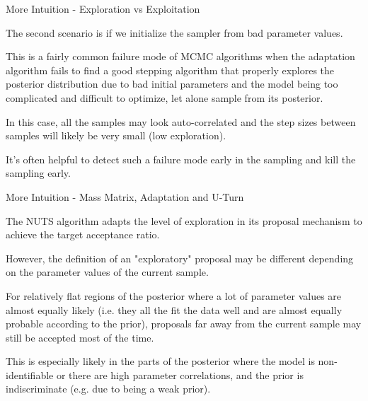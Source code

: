 \begin{frame}{More Intuition - Exploration vs Exploitation}
	\begin{vfilleditems}
		\item The second scenario is if we initialize the sampler from bad parameter values.
			\begin{vfilleditems}
				\item This is a fairly common failure mode of MCMC algorithms when the adaptation algorithm fails to find a good stepping algorithm that properly explores the posterior distribution due to bad initial parameters and the model being too complicated and difficult to optimize, let alone sample from its posterior.
				\item In this case, all the samples may look auto-correlated and the step sizes between samples will likely be very small (low exploration).
				\item It's often helpful to detect such a failure mode early in the sampling and kill the sampling early.
			\end{vfilleditems}
	\end{vfilleditems}
\end{frame}
\begin{frame}{More Intuition - Mass Matrix, Adaptation and U-Turn}
	\begin{vfilleditems}
		\item The NUTS algorithm adapts the level of exploration in its proposal mechanism to achieve the target acceptance ratio.
		\item However, the definition of an "exploratory" proposal may be different depending on the parameter values of the current sample.
		\item For relatively flat regions of the posterior where a lot of parameter values are almost equally likely (i.e. they all the fit the data well and are almost equally probable according to the prior), proposals far away from the current sample may still be accepted most of the time.
		\item This is especially likely in the parts of the posterior where the model is non-identifiable or there are high parameter correlations, and the prior is indiscriminate (e.g. due to being a weak prior).
	\end{vfilleditems}
\end{frame}

